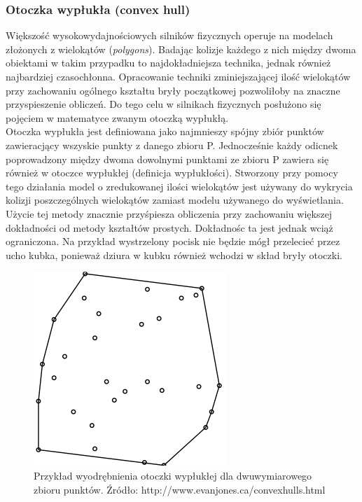 \subsubsection{Otoczka wypłukła (convex hull)}
Większość wysokowydajnościowych silników fizycznych operuje na modelach
złożonych z wielokątów (\emph{polygons}). Badając kolizje każdego z nich między
dwoma obiektami w takim przypadku to najdokładniejsza technika, jednak również
najbardziej czasochłonna. Opracowanie techniki zminiejszającej ilość wielokątów
przy zachowaniu ogólnego kształtu bryły początkowej pozwoliłoby na znaczne
przyspieszenie obliczeń. Do tego celu w silnikach fizycznych posłużono się
pojęciem w matematyce zwanym otoczką wypłukłą. \\
Otoczka wypłukła jest definiowana jako najmnieszy spójny zbiór punktów
zawieracjący wszyskie punkty z danego zbioru P. Jednocześnie każdy odicnek
poprowadzony między dwoma dowolnymi punktami ze zbioru P zawiera się również w
otoczce wypłukłej (definicja wypłukłości). Stworzony przy pomocy tego działania
model o zredukowanej ilości wielokątów jest używany do wykrycia kolizji
poszczególnych wielokątów zamiast modelu używanego do wyświetlania. Użycie tej
metody znacznie przyśpiesza obliczenia przy zachowaniu większej dokładności od
metody kształtów prostych. Dokładnośc ta jest jednak wciąż ograniczona. Na
przykład wystrzelony pocisk nie będzie mógł przelecieć przez ucho kubka,
ponieważ dziura w kubku również wchodzi w skład bryły otoczki.

\begin{figure}
\centering
\includegraphics[scale=0.5]{./img/convexhull.png}
\caption{Przykład wyodrębnienia otoczki wypłukłej dla dwuwymiarowego zbioru
punktów. Źródło: http://www.evanjones.ca/convexhulls.html}
\label{fig:convexhull}
\end{figure}

